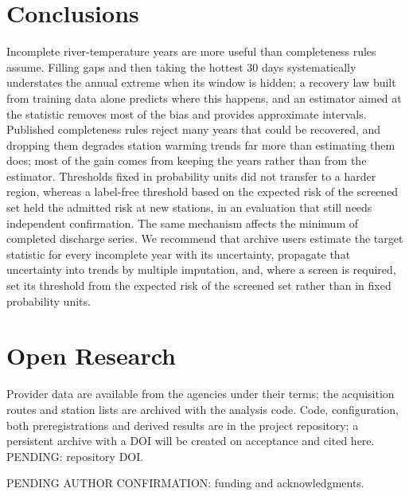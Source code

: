 \documentclass[draft]{agujournal2025}
\begin{document}
\section{Conclusions}
Incomplete river-temperature years are more useful than completeness rules assume. Filling gaps and then taking the hottest 30 days systematically understates the annual extreme when its window is hidden; a recovery law built from training data alone predicts where this happens, and an estimator aimed at the statistic removes most of the bias and provides approximate intervals. Published completeness rules reject many years that could be recovered, and dropping them degrades station warming trends far more than estimating them does; most of the gain comes from keeping the years rather than from the estimator. Thresholds fixed in probability units did not transfer to a harder region, whereas a label-free threshold based on the expected risk of the screened set held the admitted risk at new stations, in an evaluation that still needs independent confirmation. The same mechanism affects the minimum of completed discharge series. We recommend that archive users estimate the target statistic for every incomplete year with its uncertainty, propagate that uncertainty into trends by multiple imputation, and, where a screen is required, set its threshold from the expected risk of the screened set rather than in fixed probability units.

\section*{Open Research}
Provider data are available from the agencies under their terms; the acquisition routes and station lists are archived with the analysis code. Code, configuration, both preregistrations and derived results are in the project repository; a persistent archive with a DOI will be created on acceptance and cited here. PENDING: repository DOI.

\acknowledgments
PENDING AUTHOR CONFIRMATION: funding and acknowledgments.


\end{document}
